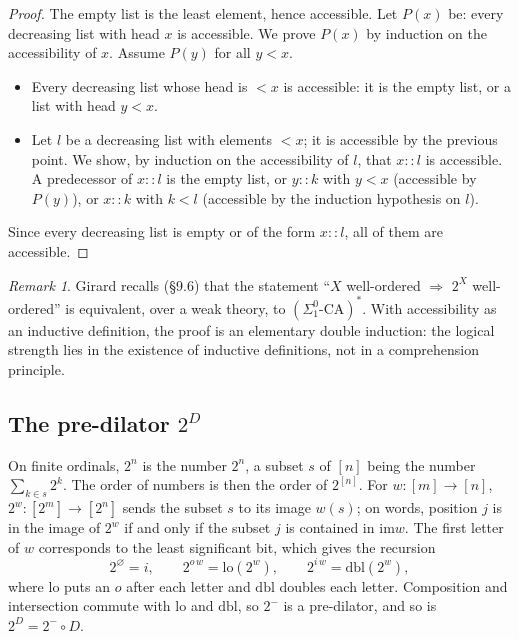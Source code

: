 \documentclass[11pt,a4paper]{article}
\theoremstyle{definition}
\theoremstyle{remark}
\newtheorem{remark}[theorem]{Remark}
\newcommand{\im}{\mathrm{im}}
\begin{document}
\begin{proof}
The empty list is the least element, hence accessible. Let $P(x)$ be:
every decreasing list with head $x$ is accessible. We prove $P(x)$ by
induction on the accessibility of $x$. Assume $P(y)$ for all $y < x$.
\begin{itemize}
\item Every decreasing list whose head is $< x$ is accessible: it is the
  empty list, or a list with head $y < x$.
\item Let $l$ be a decreasing list with elements $< x$; it is accessible
  by the previous point. We show, by induction on the accessibility of
  $l$, that $x :: l$ is accessible. A predecessor of $x :: l$ is the empty
  list, or $y :: k$ with $y < x$ (accessible by $P(y)$), or $x :: k$ with
  $k < l$ (accessible by the induction hypothesis on $l$).
\end{itemize}
Since every decreasing list is empty or of the form $x :: l$, all of them
are accessible.
\end{proof}

\begin{remark}
Girard recalls (§9.6) that the statement ``$X$ well-ordered $\Rightarrow$
$2^X$ well-ordered'' is equivalent, over a weak theory, to
$(\Sigma^0_1\text{-CA})^*$. With accessibility as an inductive definition,
the proof is an elementary double induction: the logical strength lies in
the existence of inductive definitions, not in a comprehension principle.
\end{remark}

\subsection{The pre-dilator $2^D$}

On finite ordinals, $2^n$ is the number $2^n$, a subset $s$ of $[n]$ being
the number $\sum_{k \in s} 2^k$. The order of numbers is then the order of
$2^{[n]}$. For $w : [m] \to [n]$, $2^w : [2^m] \to [2^n]$ sends the subset
$s$ to its image $w(s)$; on words, position $j$ is in the image of $2^w$
if and only if the subset $j$ is contained in $\im w$. The first letter of
$w$ corresponds to the least significant bit, which gives the recursion
\[
2^{\varnothing} = i, \qquad 2^{o\,w} = \mathrm{lo}(2^w), \qquad
2^{i\,w} = \mathrm{dbl}(2^w),
\]
where $\mathrm{lo}$ puts an $o$ after each letter and $\mathrm{dbl}$
doubles each letter. Composition and intersection commute with
$\mathrm{lo}$ and $\mathrm{dbl}$, so $2^-$ is a pre-dilator, and so is
$2^D = 2^- \circ D$.
\end{document}
